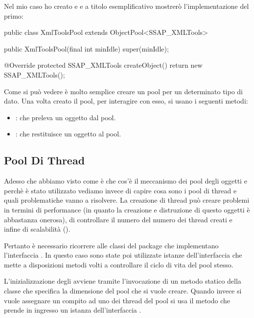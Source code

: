 Nel mio caso ho creato  e  e a titolo esemplificativo mostrerò l'implementazione del primo:

\begin{java}[caption={Implementazione di ObjectPool},label={lst:objectPool}]
public class XmlToolsPool extends ObjectPool<SSAP_XMLTools>{
	
	public XmlToolsPool(final int minIdle) {
		super(minIdle);
	}

	@Override
	protected SSAP_XMLTools createObject() {
		return new SSAP_XMLTools();
	}
}
\end{java}

\noindent
Come si può vedere è molto semplice creare un pool per un determinato tipo di dato. Una volta creato il pool, per interagire con esso, si usano i seguenti metodi:

\begin{itemize}
	\item {}: che preleva un oggetto dal pool.
	\item {}: che restituisce un oggetto al pool.
\end{itemize}

\subsection{Pool Di Thread}

Adesso che abbiamo visto come è che cos'è il meccanismo dei pool degli oggetti e perchè è stato utilizzato vediamo invece di capire cosa sono i pool di thread e quali problematiche vanno a risolvere.
La creazione di thread può creare problemi in termini di performance (in quanto la creazione e distruzione di questo oggetti è abbastanza onerosa), di controllare il numero del numero dei thread creati e infine di scalabilità (\cite{vetti2008}).

Pertanto è necessario ricorrere alle classi del package  che implementano l'interfaccia . In questo caso sono state poi utilizzate istanze dell'interfaccia  che mette a disposizioni metodi volti a controllare il ciclo di vita del pool stesso.

L'inizializzazione degli  avviene tramite l'invocazione di un metodo statico della classe  che specifica la dimensione del pool che si vuole creare. Quando invece si vuole assegnare un compito ad uno dei thread del pool si usa il metodo  che prende in ingresso un istanza dell'interfaccia .

